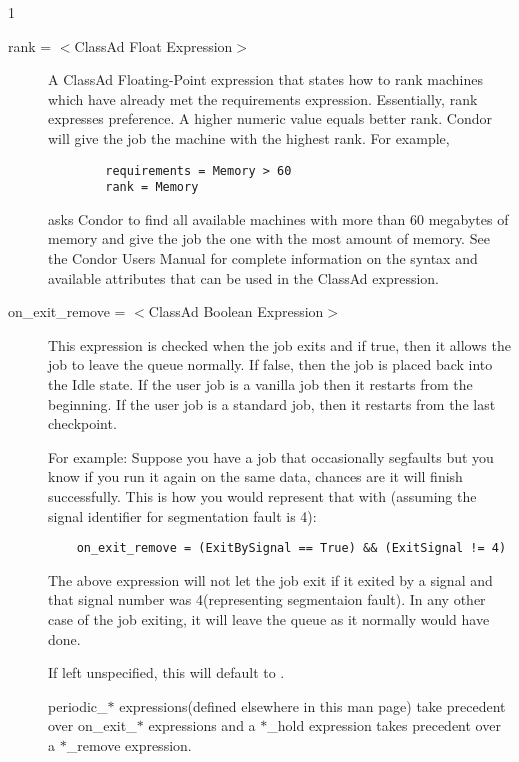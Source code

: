 \begin{ManPage}{\label{man-condor-submit}}{1}
\begin{description}

\item[rank = $<$ClassAd Float Expression$>$] A ClassAd Floating-Point 
expression that states how to rank machines which have already met the requirements
expression. Essentially, rank expresses preference.  A higher numeric value 
equals better rank. Condor will give the job the machine with the 
highest rank.  For example,
\begin{verbatim}
        requirements = Memory > 60
        rank = Memory
\end{verbatim}
asks Condor to find all available machines with more than 60 megabytes of memory
and give the job the one with the most amount of memory.  See the Condor Users
Manual for complete information on the syntax and available attributes
that can be used in the ClassAd expression.


\item[on\_exit\_remove = $<$ClassAd Boolean Expression$>$] This expression
is checked when the job exits and if true, then it allows the job to leave the
queue normally. If false, then the job is placed back into the Idle state.
If the user job is a vanilla job then it restarts from the beginning. If the
user job is a standard job, then it restarts from the last checkpoint.

For example:
Suppose you have a job that occasionally segfaults but you know if you run it
again on the same data, chances are it will finish successfully. This is
how you would represent that with (assuming the
signal identifier for segmentation fault is 4):

\begin{verbatim}
	on_exit_remove = (ExitBySignal == True) && (ExitSignal != 4)
\end{verbatim}

The above expression will not let the job exit if it exited by a signal and
that signal number was 4(representing segmentaion fault). In any other case
of the job exiting, it will leave the queue as it normally would have done.

If left unspecified, this will default to .

periodic\_$*$ expressions(defined elsewhere in this man page) take
precedent over on\_exit\_$*$ expressions and a $*$\_hold expression takes
precedent over a $*$\_remove expression.


\end{description}
\end{ManPage}
